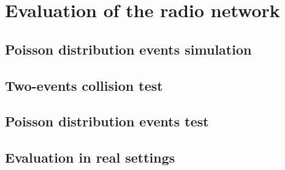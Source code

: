 \section{Evaluation of the radio network}

\subsection{Poisson distribution events simulation}



\subsection{Two-events collision test}

\subsection{Poisson distribution events test}

\subsection{Evaluation in real settings}


